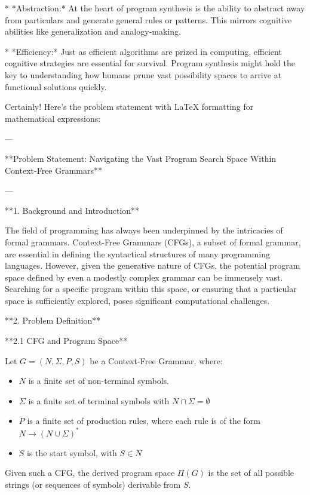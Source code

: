 * *Abstraction:* At the heart of program synthesis is the ability to abstract away from particulars and generate general rules or patterns. This mirrors cognitive abilities like generalization and analogy-making.

* *Efficiency:* Just as efficient algorithms are prized in computing, efficient cognitive strategies are essential for survival. Program synthesis might hold the key to understanding how humans prune vast possibility spaces to arrive at functional solutions quickly.

Certainly! Here's the problem statement with LaTeX formatting for mathematical expressions:

---

**Problem Statement: Navigating the Vast Program Search Space Within Context-Free Grammars**

---

**1. Background and Introduction**

The field of programming has always been underpinned by the intricacies of formal grammars. Context-Free Grammars (CFGs), a subset of formal grammar, are essential in defining the syntactical structures of many programming languages. However, given the generative nature of CFGs, the potential program space defined by even a modestly complex grammar can be immensely vast. Searching for a specific program within this space, or ensuring that a particular space is sufficiently explored, poses significant computational challenges.

**2. Problem Definition**

**2.1 CFG and Program Space**

Let \( G = (N, \Sigma, P, S) \) be a Context-Free Grammar, where:
\begin{itemize}
    \item \( N \) is a finite set of non-terminal symbols.
    \item \( \Sigma \) is a finite set of terminal symbols with \newline \( N \cap \Sigma = \emptyset \)
    \item \( P \) is a finite set of production rules, where each rule is of the form \( N \rightarrow (N \cup \Sigma)^* \)
    \item \( S \) is the start symbol, with \( S \in N \)
\end{itemize}

Given such a CFG, the derived program space \( \Pi(G) \) is the set of all possible strings (or sequences of symbols) derivable from \( S \).


